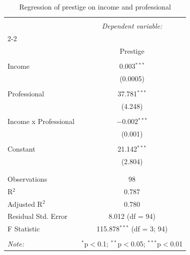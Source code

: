 
\begin{table}[H] \centering 
  \caption{Regression of prestige on income and professional} 
  \label{tab:model_prestige} 
\begin{tabular}{@{\extracolsep{5pt}}lc} 
\\[-1.8ex]\hline 
\hline \\[-1.8ex] 
 & \multicolumn{1}{c}{\textit{Dependent variable:}} \\ 
\cline{2-2} 
\\[-1.8ex] & Prestige \\ 
\hline \\[-1.8ex] 
 Income & 0.003$^{***}$ \\ 
  & (0.0005) \\ 
  & \\ 
 Professional & 37.781$^{***}$ \\ 
  & (4.248) \\ 
  & \\ 
 Income x Professional & $-$0.002$^{***}$ \\ 
  & (0.001) \\ 
  & \\ 
 Constant & 21.142$^{***}$ \\ 
  & (2.804) \\ 
  & \\ 
\hline \\[-1.8ex] 
Observations & 98 \\ 
R$^{2}$ & 0.787 \\ 
Adjusted R$^{2}$ & 0.780 \\ 
Residual Std. Error & 8.012 (df = 94) \\ 
F Statistic & 115.878$^{***}$ (df = 3; 94) \\ 
\hline 
\hline \\[-1.8ex] 
\textit{Note:}  & \multicolumn{1}{r}{$^{*}$p$<$0.1; $^{**}$p$<$0.05; $^{***}$p$<$0.01} \\ 
\end{tabular} 
\end{table}  
